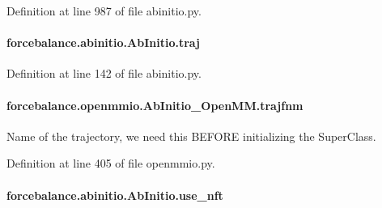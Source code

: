Definition at line 987 of file abinitio.\-py.

\hypertarget{classforcebalance_1_1abinitio_1_1AbInitio_a7b52d5101bfa4fde7129c84c0558ad14}{
\paragraph[{traj}]{\setlength{\rightskip}{0pt plus 5cm}forcebalance.\-abinitio.\-Ab\-Initio.\-traj\hspace{0.3cm}{\ttfamily [inherited]}}}\label{classforcebalance_1_1abinitio_1_1AbInitio_a7b52d5101bfa4fde7129c84c0558ad14}


Definition at line 142 of file abinitio.\-py.

\hypertarget{classforcebalance_1_1openmmio_1_1AbInitio__OpenMM_abcf5ab6d976ea05c774b8c18b5262b68}{
\paragraph[{trajfnm}]{\setlength{\rightskip}{0pt plus 5cm}forcebalance.\-openmmio.\-Ab\-Initio\-\_\-\-Open\-M\-M.\-trajfnm}}\label{classforcebalance_1_1openmmio_1_1AbInitio__OpenMM_abcf5ab6d976ea05c774b8c18b5262b68}


Name of the trajectory, we need this B\-E\-F\-O\-R\-E initializing the Super\-Class. 



Definition at line 405 of file openmmio.\-py.

\hypertarget{classforcebalance_1_1abinitio_1_1AbInitio_afd8d179560a295ffa6c6309843c59279}{
\paragraph[{use\-\_\-nft}]{\setlength{\rightskip}{0pt plus 5cm}forcebalance.\-abinitio.\-Ab\-Initio.\-use\-\_\-nft\hspace{0.3cm}{\ttfamily [inherited]}}}\label{classforcebalance_1_1abinitio_1_1AbInitio_afd8d179560a295ffa6c6309843c59279}


